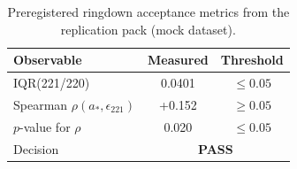 \begin{table}[ht]
\centering
\begin{tabular}{lcc}
\toprule
Observable & Measured & Threshold \\
\midrule
IQR(221/220) & 0.0401 & $\le 0.05$ \\
Spearman $\rho(a_\ast,\epsilon_{221})$ & +0.152 & $\ge 0.05$ \\
$p$-value for $\rho$ & 0.020 & $\le 0.05$ \\
\midrule
Decision & \multicolumn{2}{c}{\textbf{PASS}} \\
\bottomrule
\end{tabular}
\caption{Preregistered ringdown acceptance metrics from the replication pack (mock dataset).}
\label{tab:ringdown-acceptance}
\end{table}
